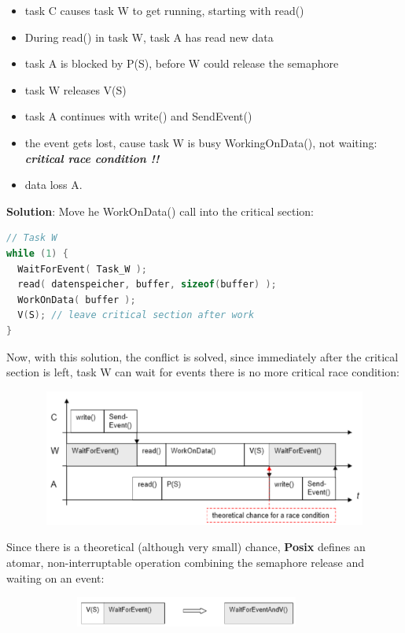 \begin{itemize}
	\item task C causes task W to get running, starting with read()
	\item During read() in task W, task A has read new data
	\item task A is blocked by P(S), before W could release the semaphore
	\item task W releases V(S)
	\item task A continues with write() and SendEvent()
	\item the event gets lost, cause task W is busy WorkingOnData(), not waiting:  \textbf{\textit{critical race condition !!}}
	\item data loss A.
\end{itemize}
  
\textbf{Solution}: Move he WorkOnData() call into the critical section:

\begin{lstlisting}[style=mystyle, language=c]
// Task W
while (1) {
  WaitForEvent( Task_W );
  read( datenspeicher, buffer, sizeof(buffer) );
  WorkOnData( buffer );
  V(S); // leave critical section after work
}
\end{lstlisting}

Now, with this solution, the conflict is solved, since immediately after the critical section is left, task W can wait for events there is no more critical race condition:

 	\begin{figure}[h]
    \centering
    \includegraphics[width=14cm, height=4.5cm]{Images/image113.png}
    \label{fig:Fig }
    \end{figure}

Since there is a theoretical (although very small) chance, \textbf{Posix} defines an atomar, non-interruptable operation combining the semaphore release and waiting on an event:

 	\begin{figure}[h]
    \centering
    \includegraphics[width=10cm, height=1cm]{Images/image114.png}
    \label{fig:Fig }
    \end{figure}
    
